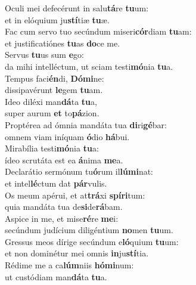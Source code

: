 \oddverse Oculi mei defecérunt in salu\textbf{tá}re \textbf{tu}um:~\*\\
\oddverse et in elóquium ju\textbf{stí}tiæ \textbf{tu}æ.\\
\evenverse Fac cum servo tuo secúndum miseri\textbf{cór}diam \textbf{tu}am:~\*\\
\evenverse et justificatiónes \textbf{tu}as \textbf{do}ce me.\\
\oddverse Servus \textbf{tu}us sum \textbf{e}go:~\*\\
\oddverse da mihi intelléctum, ut sciam testi\textbf{mó}nia \textbf{tu}a.\\
\evenverse Tempus faci\textbf{én}di, \textbf{Dó}\textbf{mi}ne:~\*\\
\evenverse dissipavérunt \textbf{le}gem \textbf{tu}am.\\
\oddverse Ideo diléxi man\textbf{dá}ta \textbf{tu}a,~\*\\
\oddverse super aurum \textbf{et} to\textbf{pá}zion.\\
\evenverse Proptérea ad ómnia mandáta tua \textbf{di}ri\textbf{gé}bar:~\*\\
\evenverse omnem viam iníquam \textbf{ó}dio \textbf{há}bui.\\
\oddverse Mirabília testi\textbf{mó}nia \textbf{tu}a:~\*\\
\oddverse ídeo scrutáta est ea \textbf{á}nima \textbf{me}a.\\
\evenverse Declarátio sermónum tu\textbf{ó}rum il\textbf{lú}\textbf{mi}nat:~\*\\
\evenverse et intel\textbf{lé}ctum dat \textbf{pár}vulis.\\
\oddverse Os meum apérui, et at\textbf{trá}xi \textbf{spí}\textbf{ri}tum:~\*\\
\oddverse quia mandáta tua de\textbf{si}de\textbf{rá}bam.\\
\evenverse Aspice in me, et mise\textbf{ré}re \textbf{me}i:~\*\\
\evenverse secúndum judícium diligéntium \textbf{no}men \textbf{tu}um.\\
\oddverse Gressus meos dírige secúndum e\textbf{ló}quium \textbf{tu}um:~\*\\
\oddverse et non dominétur mei omnis \textbf{in}ju\textbf{stí}tia.\\
\evenverse Rédime me a ca\textbf{lúm}niis \textbf{hó}\textbf{mi}num:~\*\\
\evenverse ut custódiam man\textbf{dá}ta \textbf{tu}a.\\
